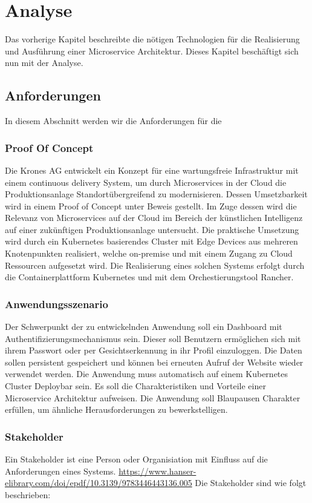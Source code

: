 \chapter{Analyse}

Das vorherige Kapitel beschreibte die nötigen Technologien für die Realisierung und Ausführung einer Microservice Architektur.
Dieses Kapitel beschäftigt sich nun mit der Analyse. 

\section{Anforderungen}

In diesem Abschnitt werden wir die Anforderungen für die 


\subsection{Proof Of Concept}
Die Krones AG entwickelt ein Konzept für eine wartungsfreie Infrastruktur mit einem continuous delivery System, um durch Microservices in der Cloud die Produktionsanlage Standortübergreifend zu modernisieren. 
Dessen Umsetzbarkeit wird in einem Proof of Concept unter Beweis gestellt. 
Im Zuge dessen wird die Relevanz von Microservices auf der Cloud im Bereich der künstlichen Intelligenz auf einer zukünftigen Produktionsanlage untersucht. 
Die praktische Umsetzung wird durch ein Kubernetes basierendes Cluster mit Edge Devices aus mehreren Knotenpunkten realisiert, welche on-premise und mit einem Zugang zu Cloud Ressourcen aufgesetzt wird. 
Die Realisierung eines solchen Systems erfolgt durch die Containerplattform Kubernetes und mit dem Orchestierungstool Rancher.

\subsection{Anwendungsszenario}
Der Schwerpunkt der zu entwickelnden Anwendung soll ein Dashboard mit Authentifizierungsmechanismus sein. 
Dieser soll Benutzern ermöglichen sich mit ihrem Passwort oder per Gesichtserkennung in ihr Profil einzuloggen. 
Die Daten sollen persistent gespeichert und können bei erneuten Aufruf der Website wieder verwendet werden. 
Die Anwendung muss automatisch auf einem Kubernetes Cluster Deploybar sein. 
Es soll die Charakteristiken und Vorteile einer Microservice Architektur aufweisen. 
Die Anwendung soll Blaupausen Charakter erfüllen, um ähnliche Herausforderungen zu bewerkstelligen. 

\subsection{Stakeholder}
Ein Stakeholder ist eine Person oder Organisiation mit Einfluss auf die Anforderungen eines Systems.
\url{https://www.hanser-elibrary.com/doi/epdf/10.3139/9783446443136.005}
Die Stakeholder sind wie folgt beschrieben:

